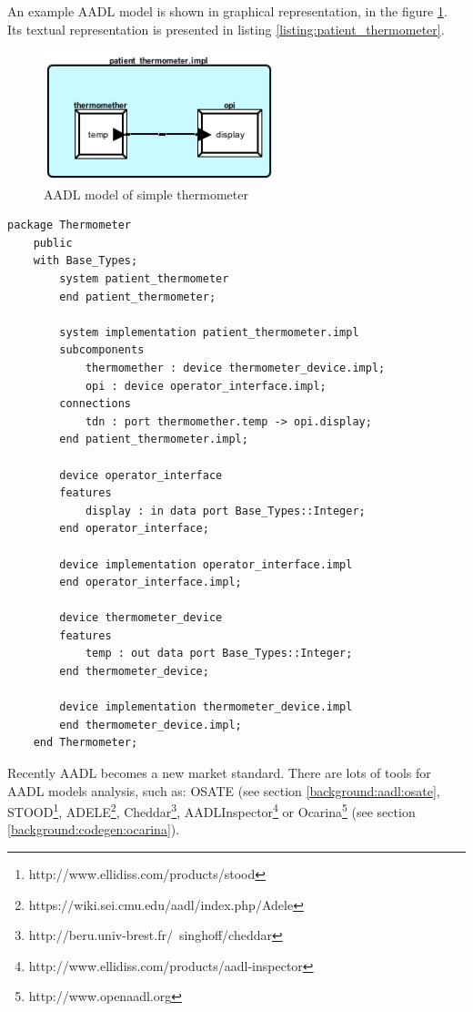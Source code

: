 An example AADL model is shown in graphical representation, in the figure \ref{figure:patient_thermometer}. Its textual representation is presented in listing \ref{listing:patient_thermometer}.

\begin{figure}[ht]%
    \begin{center}
    	\includegraphics[width=0.6\textwidth]{figures/patient_thermometer.png}    	
    \end{center}
    \caption{AADL model of simple thermometer}
    \label{figure:patient_thermometer}
\end{figure}

\singlespacing
\begin{lstlisting}[language=aadl, frame=single, gobble=0, caption={AADL model of simple thermometer}, label={listing:patient_thermometer}]
	package Thermometer
	public
	with Base_Types;
		system patient_thermometer
		end patient_thermometer;

		system implementation patient_thermometer.impl
		subcomponents
			thermomether : device thermometer_device.impl;
			opi : device operator_interface.impl;
		connections
			tdn : port thermomether.temp -> opi.display;
		end patient_thermometer.impl;

		device operator_interface
		features
			display : in data port Base_Types::Integer;
		end operator_interface;

		device implementation operator_interface.impl
		end operator_interface.impl;

		device thermometer_device
		features
			temp : out data port Base_Types::Integer;
		end thermometer_device;

		device implementation thermometer_device.impl
		end thermometer_device.impl;
	end Thermometer;
\end{lstlisting} 
\doublespacing

Recently AADL becomes a new market standard. There are lots of tools for AADL models analysis, such as: OSATE (see section \ref{background:aadl:osate}, STOOD\footnote{http://www.ellidiss.com/products/stood}, ADELE\footnote{https://wiki.sei.cmu.edu/aadl/index.php/Adele}, Cheddar\footnote{http://beru.univ-brest.fr/~singhoff/cheddar}, AADLInspector\footnote{http://www.ellidiss.com/products/aadl-inspector} or Ocarina\footnote{http://www.openaadl.org} (see section \ref{background:codegen:ocarina}).

